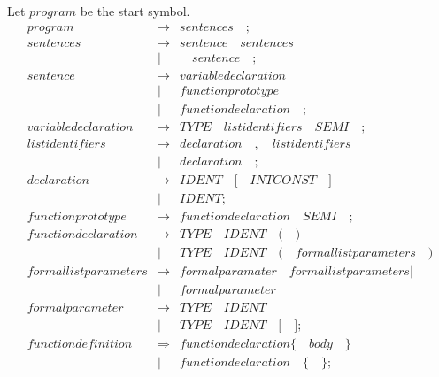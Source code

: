 \documentclass{article}
\begin{document}
Let $program$ be the start symbol. 
\begin{eqnarray}
  \mathit{program} & \rightarrow & \mathit{sentences} \quad ;
  \\
    \mathit{sentences} & \rightarrow & \mathit{sentence} \quad \mathit{sentences} \quad  \\
    & | & \quad \mathit{sentence} \quad ;
    \\
      \mathit{sentence} & \rightarrow & \mathit{variabledeclaration} \quad \\
      & |& \mathit{functionprototype} \quad \\
      & |& \mathit{functiondeclaration} \quad ;
\\
  \mathit{variabledeclaration} & \rightarrow & \mathit{TYPE} \quad \mathit{listidentifiers} \quad \mathit{SEMI} \quad ; 
  \\
  \mathit{listidentifiers} & \rightarrow & \mathit{declaration} \quad \mathit{,} \quad \mathit{listidentifiers} \quad   \\
  &  |& \mathit{declaration} \quad ; \\
  \mathit{declaration} & \rightarrow & \mathit{IDENT} \quad \mathit{[} \quad  \mathit{INTCONST} \quad \mathit{]} \quad  \\
  & | & \mathit{IDENT} ;  \\
  \mathit{functionprototype} & \rightarrow &  \mathit{functiondeclaration}  \quad \mathit{SEMI} \quad ;\\
  \mathit{functiondeclaration} & \rightarrow & \mathit{TYPE} \quad \mathit{IDENT} \quad  \mathit{(} \quad\mathit{)} \\
  & | & \mathit{TYPE}\quad\mathit{IDENT} \quad \mathit{(} \quad \mathit{formallistparameters} \quad \mathit{)}  \\ 
   \mathit{formallistparameters} & \rightarrow & \mathit{formalparamater} \quad \mathit{formallistparameters}  | \\
   & | & \mathit{formalparameter} \\
   \mathit{formalparameter} & \rightarrow & \mathit{TYPE} \quad \mathit{IDENT}  \\
   & | & \mathit{TYPE} \quad \mathit{IDENT} \quad \mathit{[} \quad \mathit{]} ; \\
   \mathit{functiondefinition} & \Rightarrow & \mathit{functiondeclaration} \mathit{\{}\quad \mathit{body}  \quad \mathit{\}}  \\
   & | & \mathit{functiondeclaration} \quad \mathit{\{} \quad \mathit{\}} ;  \\

\end{eqnarray}
\end{document}
